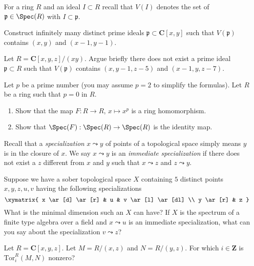 \noindent
For a ring $R$ and an ideal $I \subset R$ recall that $V(I)$
denotes the set of $\mathfrak p \in \Spec(R)$ with $I \subset \mathfrak p$.

\begin{exercise}
\label{exercise-infinitely-many-primes}
Construct infinitely many distinct prime ideals
$\mathfrak p \subset \mathbf{C}[x, y]$
such that $V(\mathfrak p)$ contains $(x, y)$ and $(x - 1, y - 1)$.
\end{exercise}

\begin{exercise}[No prime]
\label{exercise-no-prime}
Let $R = \mathbf{C}[x, y, z]/(xy)$. Argue briefly there does not exist
a prime ideal $\mathfrak p \subset R$ such that
$V(\mathfrak p)$ contains $(x, y - 1, z - 5)$ and $(x - 1, y, z - 7)$.
\end{exercise}

\begin{exercise}[Frobenius]
\label{exercise-frobenius}
Let $p$ be a prime number (you may assume $p = 2$ to simplify the formulas).
Let $R$ be a ring such that $p = 0$ in $R$.
\begin{enumerate}
\item Show that the map $F : R \to R$, $x \mapsto x^p$ is a ring homomorphism.
\item Show that $\Spec(F) : \Spec(R) \to \Spec(R)$ is the identity map.
\end{enumerate}
\end{exercise}

\noindent
Recall that a {\it specialization} $x \leadsto y$ of points of a topological
space simply means $y$ is in the closure of $x$. We say $x \leadsto y$ is an
{\it immediate specialization} if there does not exist a $z$ different
from $x$ and $y$ such that $x \leadsto z$ and $z \leadsto y$.

\begin{exercise}[Dimension]
\label{exercise-dimension}
Suppose we have a sober topological space $X$ containing $5$ distinct points
$x, y, z, u, v$ having the following specializations
$$
\xymatrix{
x \ar[d] \ar[r] & u & v \ar[l] \ar[dl] \\
y \ar[r] & z
}
$$
What is the minimal dimension such an $X$ can have? If $X$ is the spectrum
of a finite type algebra over a field and $x \leadsto u$ is an
immediate specialization, what can you say about the
specialization $v \leadsto z$?
\end{exercise}

\begin{exercise}
\label{exercise-tor-computation}
Let $R = \mathbf{C}[x, y, z]$. Let $M = R/(x, z)$ and $N = R/(y, z)$.
For which $i \in \mathbf{Z}$ is $\text{Tor}_i^R(M, N)$ nonzero?
\end{exercise}

